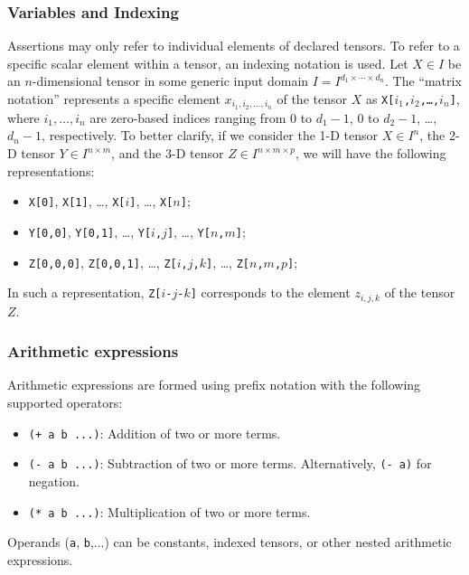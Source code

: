 \subsubsection*{Variables and Indexing}
\label{sec:variables-and-indexing}
Assertions may only refer to individual elements of declared tensors. To refer to a specific scalar element within a tensor, an indexing notation is used. Let $X \in I$ be an $n$-dimensional tensor 
in some generic input domain $I = I^{d_1 \times \cdots \times d_n}$. The ``matrix notation'' represents a specific element $x_{i_1, i_2, \dots, i_n}$ of the tensor $X$ as \texttt{X[$i_1$,$i_2$,\dots,$i_n$]}, 
where $i_1, \dots, i_n$ are zero-based indices ranging from $0$ to $d_1{-}1$, $0$ to $d_2{-}1$, \dots, $d_n{-}1$, respectively. To better clarify, if we consider the 1-D tensor $X \in I^n$, the 2-D tensor 
$Y \in I^{n \times m}$, and the 3-D tensor $Z \in I^{n \times m \times p}$, we will have the following representations:
\begin{itemize}
    \item \texttt{X[0]}, \texttt{X[1]}, \dots, \texttt{X[$i$]}, \dots, \texttt{X[$n$]};
    \item \texttt{Y[0,0]}, \texttt{Y[0,1]}, \dots, \texttt{Y[$i$,$j$]}, \dots, \texttt{Y[$n$,$m$]};
    \item \texttt{Z[0,0,0]}, \texttt{Z[0,0,1]}, \dots, \texttt{Z[$i$,$j$,$k$]}, \dots, \texttt{Z[$n$,$m$,$p$]};
\end{itemize}
In such a representation, \texttt{Z[$i$-$j$-$k$]} corresponds to the element $z_{i,j,k}$ of the tensor $Z$. 

\subsubsection*{Arithmetic expressions}
Arithmetic expressions are formed using prefix notation with the following supported operators:
\begin{itemize}
    \item \texttt{(+ a b ...)}: Addition of two or more terms. 
    \item \texttt{(- a b ...)}: Subtraction of two or more terms. Alternatively, \texttt{(- a)} for negation.
    \item \texttt{(* a b ...)}: Multiplication of two or more terms. 
\end{itemize}
Operands (\texttt{a}, \texttt{b},...) can be constants, indexed tensors, or other nested arithmetic expressions.

